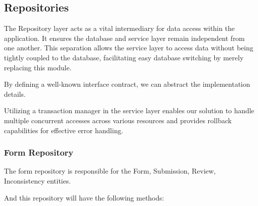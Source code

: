 \subsection{Repositories}

The Repository layer acts as a vital intermediary for data access within the application. It ensures the database and service layer remain independent from one another. This separation allows the service layer to access data without being tightly coupled to the database, facilitating easy database switching by merely replacing this module.

By defining a well-known interface contract, we can abstract the implementation details.

Utilizing a transaction manager in the service layer enables our solution to handle multiple concurrent accesses across various resources and provides rollback capabilities for effective error handling.


\subsubsection{Form Repository}

The form repository is responsible for the Form, Submission, Review, Inconsistency entities.

And this repository will have the following methods:

